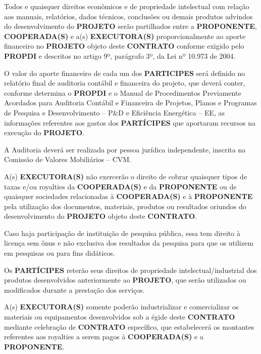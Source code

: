 
\xx Todos e quaisquer direitos econômicos e de propriedade intelectual com relação aos manuais, relatórios, dados técnicos, conclusões ou demais produtos advindos do desenvolvimento do \textbf{PROJETO} serão partilhados entre a \textbf{PROPONENTE}, \textbf{COOPERADA(S)} e a(s) \textbf{EXECUTORA(S)} proporcionalmente ao aporte financeiro no \textbf{PROJETO} objeto deste \textbf{CONTRATO} conforme exigido pelo \textbf{PROPDI} e descritos no artigo 9º, parágrafo 3º, da Lei nº 10.973 de 2004.

\xxx O valor do aporte financeiro de cada um dos \textbf{PARTICIPES} será definido no relatório final de auditoria contábil e financeira do projeto, que deverá conter, conforme determina o \textbf{PROPDI} e o Manual de Procedimentos Previamente Acordados para Auditoria Contábil e Financeira de Projetos, Planos e Programas de Pesquisa e Desenvolvimento – P\&D e Eficiência Energética – EE, as informações referentes aos gastos dos \textbf{PARTÍCIPES} que aportaram recursos na execução do \textbf{PROJETO}.

\xxxx A Auditoria deverá ser realizada por pessoa jurídica independente, inscrita na Comissão de Valores Mobiliários – CVM.

\xxx A(s) \textbf{EXECUTORA(S)} não exercerão o direito de cobrar quaisquer tipos de taxas e/ou royalties da \textbf{COOPERADA(S)} e da \textbf{PROPONENTE} ou de quaisquer sociedades relacionadas à \textbf{COOPERADA(S)} e à \textbf{PROPONENTE} pela utilização dos documentos, materiais, produtos ou resultados oriundos do desenvolvimento do \textbf{PROJETO} objeto deste \textbf{CONTRATO}.

\xxx Caso haja participação de instituição de pesquisa pública, essa tem direito à licença sem ônus e não exclusiva dos resultados da pesquisa para que os utilizem em pesquisas ou para fins didáticos.

\xx Os \textbf{PARTÍCIPES} reterão seus direitos de propriedade intelectual/industrial dos produtos desenvolvidos anteriormente ao \textbf{PROJETO}, que serão utilizados ou modificados durante a prestação dos serviços.

\xx A(s) \textbf{EXECUTORA(S)} somente poderão industrializar e comercializar os materiais ou equipamentos desenvolvidos sob a égide deste \textbf{CONTRATO} mediante celebração de \textbf{CONTRATO} específico, que estabelecerá os montantes referentes aos royalties a serem pagos à \textbf{COOPERADA(S)} e a \textbf{PROPONENTE}.

